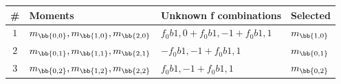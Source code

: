 \begin{table}[!h]
\centering
\begin{tabular}{c l l l}
\toprule
\# & Moments & Unknown f combinations & Selected\\
\midrule
\multirow{ 1}{*}{$1$} & \multirow{ 1}{*}{$m_\bb{0,0}, m_\bb{1,0}, m_\bb{2,0}$} & $f_0b{1,0}+f_0b{1,-1}+f_0b{1,1}$ & \multirow{ 1}{*}{$m_\bb{1,0}$}\\ 
\midrule
\multirow{ 1}{*}{$2$} & \multirow{ 1}{*}{$m_\bb{0,1}, m_\bb{1,1}, m_\bb{2,1}$} & $-f_0b{1,-1}+f_0b{1,1}$ & \multirow{ 1}{*}{$m_\bb{0,1}$}\\ 
\midrule
\multirow{ 1}{*}{$3$} & \multirow{ 1}{*}{$m_\bb{0,2}, m_\bb{1,2}, m_\bb{2,2}$} & $f_0b{1,-1}+f_0b{1,1}$ & \multirow{ 1}{*}{$m_\bb{0,2}$}\\ 
\bottomrule
\end{tabular}\end{table}
